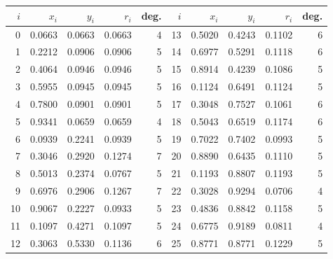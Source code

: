\begin{tabular}{rrrrr@{\hspace{14pt}}rrrrr}
\toprule
$i$ & $x_i$ & $y_i$ & $r_i$ & deg. & $i$ & $x_i$ & $y_i$ & $r_i$ & deg. \\
\midrule
0 & 0.0663 & 0.0663 & 0.0663 & 4 & 13 & 0.5020 & 0.4243 & 0.1102 & 6 \\
1 & 0.2212 & 0.0906 & 0.0906 & 5 & 14 & 0.6977 & 0.5291 & 0.1118 & 6 \\
2 & 0.4064 & 0.0946 & 0.0946 & 5 & 15 & 0.8914 & 0.4239 & 0.1086 & 5 \\
3 & 0.5955 & 0.0945 & 0.0945 & 5 & 16 & 0.1124 & 0.6491 & 0.1124 & 5 \\
4 & 0.7800 & 0.0901 & 0.0901 & 5 & 17 & 0.3048 & 0.7527 & 0.1061 & 6 \\
5 & 0.9341 & 0.0659 & 0.0659 & 4 & 18 & 0.5043 & 0.6519 & 0.1174 & 6 \\
6 & 0.0939 & 0.2241 & 0.0939 & 5 & 19 & 0.7022 & 0.7402 & 0.0993 & 5 \\
7 & 0.3046 & 0.2920 & 0.1274 & 7 & 20 & 0.8890 & 0.6435 & 0.1110 & 5 \\
8 & 0.5013 & 0.2374 & 0.0767 & 5 & 21 & 0.1193 & 0.8807 & 0.1193 & 5 \\
9 & 0.6976 & 0.2906 & 0.1267 & 7 & 22 & 0.3028 & 0.9294 & 0.0706 & 4 \\
10 & 0.9067 & 0.2227 & 0.0933 & 5 & 23 & 0.4836 & 0.8842 & 0.1158 & 5 \\
11 & 0.1097 & 0.4271 & 0.1097 & 5 & 24 & 0.6775 & 0.9189 & 0.0811 & 4 \\
12 & 0.3063 & 0.5330 & 0.1136 & 6 & 25 & 0.8771 & 0.8771 & 0.1229 & 5 \\
\bottomrule
\end{tabular}
